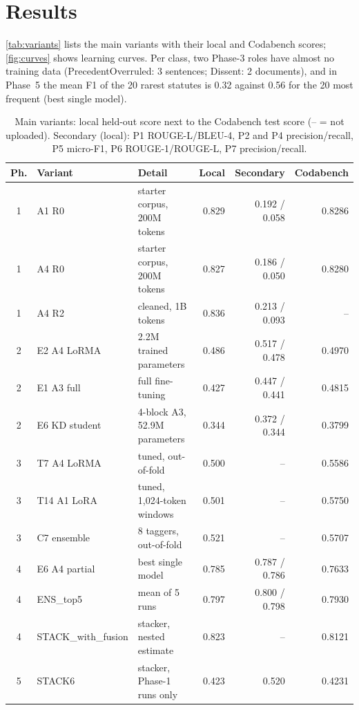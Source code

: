 \documentclass[11pt, oneside]{article}
\begin{document}
\section{Results}
\autoref{tab:variants} lists the main variants with their local and Codabench scores; \autoref{fig:curves}
shows learning curves.  Per class, two Phase-3 roles have almost no
training data (PrecedentOverruled: 3 sentences; Dissent: 2 documents), and in Phase~5 the mean F1 of the 20 rarest statutes is 0.32 against 0.56 for the 20 most frequent (best single model).

\begin{table}[!t]\centering\footnotesize
\caption{Main variants: local held-out score next to the Codabench test score (-- = not uploaded).  Secondary
(local): P1 ROUGE-L/BLEU-4, P2 and P4 precision/recall, P5 micro-F1, P6 ROUGE-1/ROUGE-L, P7 precision/recall.}\label{tab:variants}
\scriptsize\begin{tabularx}{\linewidth}{clXrrr}\toprule
Ph. & Variant & Detail & Local & Secondary & Codabench\\\midrule
1 & A1 R0 & starter corpus, 200M tokens & 0.829 & 0.192 / 0.058 & 0.8286\\
1 & A4 R0 & starter corpus, 200M tokens & 0.827 & 0.186 / 0.050 & 0.8280\\
1 & A4 R2 & cleaned, 1B tokens & 0.836 & 0.213 / 0.093 & --\\
2 & E2 A4 LoRMA & 2.2M trained parameters & 0.486 & 0.517 / 0.478 & 0.4970\\
2 & E1 A3 full & full fine-tuning & 0.427 & 0.447 / 0.441 & 0.4815\\
2 & E6 KD student & 4-block A3, 52.9M parameters & 0.344 & 0.372 / 0.344 & 0.3799\\
3 & T7 A4 LoRMA & tuned, out-of-fold & 0.500 & -- & 0.5586\\
3 & T14 A1 LoRA & tuned, 1,024-token windows & 0.501 & -- & 0.5750\\
3 & C7 ensemble & 8 taggers, out-of-fold & 0.521 & -- & 0.5707\\
4 & E6 A4 partial & best single model & 0.785 & 0.787 / 0.786 & 0.7633\\
4 & ENS\_top5 & mean of 5 runs & 0.797 & 0.800 / 0.798 & 0.7930\\
4 & STACK\_with\_fusion & stacker, nested estimate & 0.823 & -- & 0.8121\\
5 & STACK6 & stacker, Phase-1 runs only & 0.423 & 0.520 & 0.4231\\

\end{tabularx}
\end{table}
\end{document}
